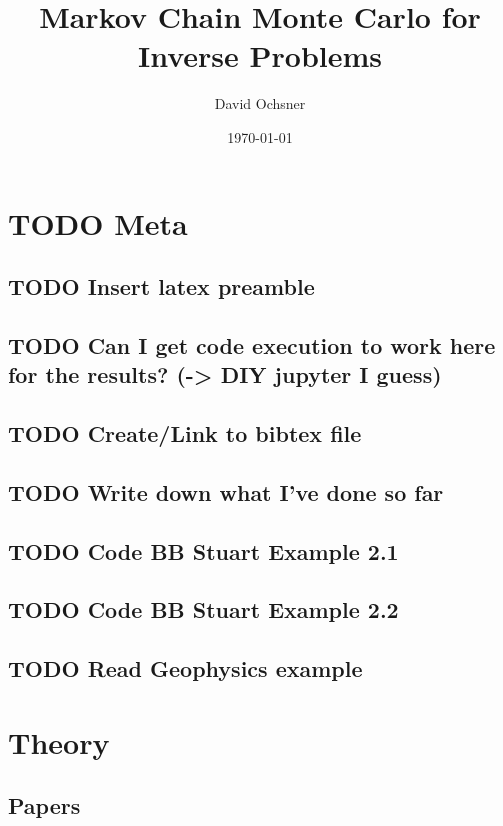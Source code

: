 \documentclass[11pt]{article}
\author{David Ochsner}
\date{\today}
\title{Markov Chain Monte Carlo for Inverse Problems}
\begin{document}
\maketitle
\tableofcontents


\section{{\bfseries\sffamily TODO} Meta}
\label{sec:org753637a}
\subsection{{\bfseries\sffamily TODO} Insert latex preamble}
\label{sec:orgfce5fd3}
\subsection{{\bfseries\sffamily TODO} Can I get code execution to work here for the results? (-> DIY jupyter I guess)}
\label{sec:orgb3b46b3}
\subsection{{\bfseries\sffamily TODO} Create/Link to bibtex file}
\label{sec:orgd0ab57f}
\subsection{{\bfseries\sffamily TODO} Write down what I've done so far}
\label{sec:org551c124}
\subsection{{\bfseries\sffamily TODO} Code BB Stuart Example 2.1}
\label{sec:orgfc82dbc}
\subsection{{\bfseries\sffamily TODO} Code BB Stuart Example 2.2}
\label{sec:org51ad662}
\subsection{{\bfseries\sffamily TODO} Read Geophysics example}
\label{sec:org28e050a}

\section{Theory}
\label{sec:orgfb52bf4}
\subsection{Papers}
\label{sec:org7bbc79c}
\end{document}

